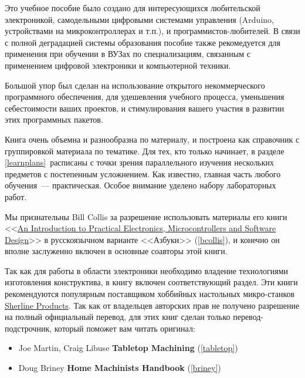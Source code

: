 
Это учебное пособие было создано для интересующихся любительской электроникой,
самодельными цифровыми системами управления (Arduino, устройствами на
микроконтроллерах и т.п.), и программистов-любителей. В связи с полной
деградацией системы образования пособие также рекомедуется для применения при
обучении в ВУЗах по специализациям, связанным с применением цифровой электроники
и компьютерной техники.

Большой упор был сделан на использование открытого некоммерческого программного
обеспечения, для удешевления учебного процесса, уменьшения себестоимости ваших
проектов, и
стимулирования вашего участия в развитии этих программных пакетов.

Книга очень объемна и разнообразна по материалу, и построена как справочник с
группировкой материала по тематике. Для тех, кто только начинает, в разделе
\ref{learnplans}\ расписаны  с
точки зрения параллельного изучения нескольких предметов с постепенным
усложнением. Как
известно, главная часть любого обучения\ --- практическая. Особое внимание
уделено набору лабораторных работ.

\bigskip
Мы признательны Bill Collis за разрешение использовать материалы его книги
<<\href{www.techideas.co.nz}{An Introduction to
Practical Electronics,
Microcontrollers and
Software Design}>> \cite{bcollis} в
русскоязычном варианте <<Азбуки>> (\ref{bcollis}), и конечно он вполне
заслуженно включен в основные соавторы этой книги.

\bigskip
Так как для работы в области электроники необходимо владение технологиями
изготовления конструктива, в книгу включен соответствующий раздел. 
Эти книги рекомендуются популярным поставщиком хоббийных настольных
микро-станков \href{http://sherline.com/}{Sherline Products}. Так как от
владельцев авторских прав не получено разрешение на полный официальный перевод,
для этих книг сделан только перевод-подстрочник, который поможет вам читать
оригинал:
\begin{itemize}
  \item Joe Martin, Craig Libuse \textbf{Tabletop Machining}
  \cite{tabletop} (\ref{tabletop})
  \item Doug Briney \textbf{Home Machinists Handbook}
  \cite{briney} (\ref{briney})
\end{itemize}

